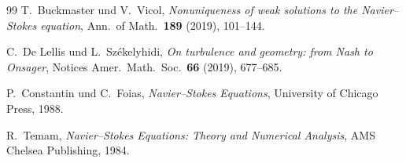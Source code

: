 \documentclass[12pt,a4paper]{article}
\theoremstyle{remark}
\begin{document}
\begin{thebibliography}{99}
T.~Buckmaster und V.~Vicol,
\textit{Nonuniqueness of weak solutions to the Navier--Stokes equation},
Ann.\ of Math.\ \textbf{189} (2019), 101--144.

C.~De Lellis und L.~Székelyhidi,
\textit{On turbulence and geometry: from Nash to Onsager},
Notices Amer.\ Math.\ Soc.\ \textbf{66} (2019), 677--685.

P.~Constantin und C.~Foias,
\textit{Navier--Stokes Equations},
University of Chicago Press, 1988.

R.~Temam,
\textit{Navier--Stokes Equations: Theory and Numerical Analysis},
AMS Chelsea Publishing, 1984.

\end{thebibliography}
\end{document}
